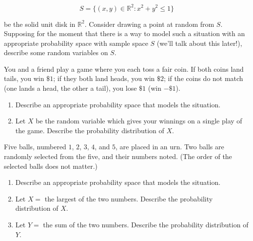 \documentclass[12pt,reqno]{amsart}
\begin{document}
	\[
	S = \{ (x,y) \in \mathbb{R}^2 : x^2+y^2 \leq 1\}
	\]

be the solid unit disk in $\mathbb{R}^2$. Consider drawing a point at random from $S$. Supposing for the moment that there is a way to model such a situation with an appropriate probability space with sample space $S$ (we'll talk about this later!), describe some random variables on $S$.\vfill

























\bigskip
\prob You and a friend play a game where you each toss a fair coin. If both coins land tails, you win $\$1$; if they both land heads, you win $\$2$; if the coins do not match (one lands a head, the other a tail), you lose $\$1$ (win $-\$1$).

\medskip
\begin{enumerate}
\item Describe an appropriate probability space that models the situation.\vfill
\item Let $X$ be the random variable which gives your winnings on a single play of the game. Describe the probability distribution of $X$.\vfill
\end{enumerate}























\newpage
\prob Five balls, numbered $1$, $2$, $3$, $4$, and $5$, are placed in an urn. Two balls are randomly selected from the five, and their numbers noted. (The order of the selected balls does not matter.)

\medskip
\begin{enumerate}
\item Describe an appropriate probability space that models the situation.\vfill
\item Let $X = $ the largest of the two numbers. Describe the probability distribution of $X$.\vfill
\item Let $Y = $ the sum of the two numbers. Describe the probability distribution of $Y$.\vfill
\end{enumerate}
\end{document}
